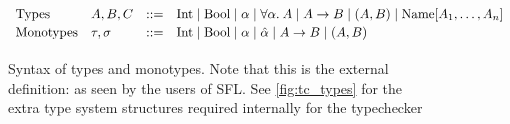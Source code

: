 \begin{figure}[h]
  \centering
  \[
      \begin{array}{llcl}
      \text{Types} & A, B, C & \mathrel{::=} &
            \text{Int} \mathrel{\mid} \text{Bool} \mathrel{\mid} \alpha \mathrel{\mid} 
            \forall\alpha.\:{A} \mathrel{\mid} A \rightarrow B \mathrel{\mid}
            (A, B) \mathrel{\mid}
            \text{Name}[A_1, \dots, A_n]
      \\[2pt]
      \text{Monotypes} & \tau,\sigma & \mathrel{::=} &
            \text{Int} \mathrel{\mid} \text{Bool} \mathrel{\mid} \alpha \mathrel{\mid} \hat{\alpha} \mathrel{\mid} 
            A \rightarrow B \mathrel{\mid} (A, B)
        \\[2pt]
      \end{array}
  \]
  
  \captionsetup{justification=centering}\caption{Syntax of types and monotypes. Note that this is the external definition: as seen by the users of SFL. See \ref{fig:tc_types} for the extra type system structures required internally for the typechecker}
\end{figure}